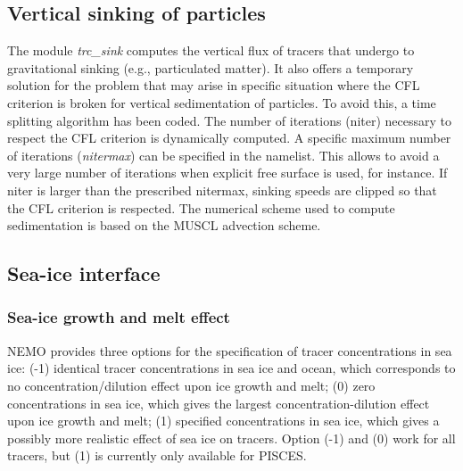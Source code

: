 \documentclass[../main/TOP_manual]{subfiles}
\begin{document}

\subsection{Vertical sinking of particles}

The module \textit{trc\_sink} computes the vertical flux of tracers that undergo to gravitational sinking (e.g., particulated matter). It also offers a temporary solution for the problem that may arise in specific situation where the CFL criterion is broken for vertical sedimentation of particles. To avoid this, a time splitting algorithm has been coded. The number of iterations (niter) necessary to respect the CFL criterion is dynamically computed. A specific maximum number of iterations (\textit{nitermax}) can be specified in the namelist. This allows to avoid a very large number of iterations when explicit free surface is used, for instance. If niter is larger than the prescribed nitermax, sinking speeds are clipped so that the CFL criterion is respected. The numerical scheme used to compute sedimentation is based on the MUSCL advection scheme.


\subsection{Sea-ice interface}

\subsubsection{Sea-ice growth and melt effect}

NEMO provides three options for the specification of tracer concentrations in sea ice: (-1) identical tracer concentrations in sea ice and ocean, which corresponds to no concentration/dilution effect upon ice growth and melt; (0) zero concentrations in sea ice, which gives the largest concentration-dilution effect upon ice growth and melt; (1) specified concentrations in sea ice, which gives a possibly more realistic effect of sea ice on tracers. Option (-1) and (0) work for all tracers, but (1) is currently only available for PISCES.
\end{document}
